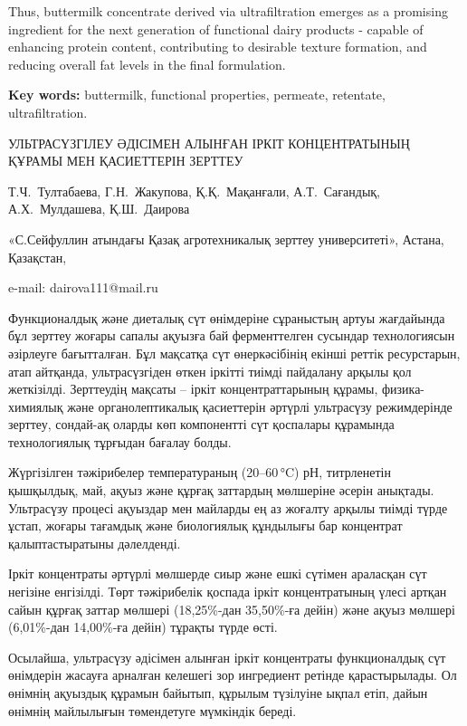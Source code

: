 Thus, buttermilk concentrate derived via ultrafiltration emerges as a
promising ingredient for the next generation of functional dairy
products - capable of enhancing protein content, contributing to
desirable texture formation, and reducing overall fat levels in the
final formulation.

{\bfseries Key words:} buttermilk, functional properties, permeate,
retentate, ultrafiltration.

\begin{header}
УЛЬТРАСҮЗГІЛЕУ ӘДІСІМЕН АЛЫНҒАН ІРКІТ КОНЦЕНТРАТЫНЫҢ ҚҰРАМЫ МЕН ҚАСИЕТТЕРІН ЗЕРТТЕУ

Т.Ч.~Тултабаева,
Г.Н.~Жакупова,
Қ.Қ.~Мақанғали,
А.Т.~Сағандық,
А.Х.~Мулдашева,
Қ.Ш.~Даирова\envelope
\end{header}

\begin{affil}
«С.Сейфуллин атындағы Қазақ агротехникалық зерттеу университеті», Астана, Қазақстан,

e-mail: dairova111@mail.ru
\end{affil}

Функционалдық және диеталық сүт өнімдеріне сұраныстың артуы жағдайында
бұл зерттеу жоғары сапалы ақуызға бай ферменттелген сусындар
технологиясын әзірлеуге бағытталған. Бұл мақсатқа сүт өнеркәсібінің
екінші реттік ресурстарын, атап айтқанда, ультрасүзгіден өткен іркітті
тиімді пайдалану арқылы қол жеткізілді. Зерттеудің мақсаты -- іркіт
концентраттарының құрамы, физика-химиялық және органолептикалық
қасиеттерін әртүрлі ультрасүзу режимдерінде зерттеу, сондай-ақ оларды
көп компонентті сүт қоспалары құрамында технологиялық тұрғыдан бағалау
болды.

Жүргізілген тәжірибелер температураның (20--60\,°C) рН, титрленетін
қышқылдық, май, ақуыз және құрғақ заттардың мөлшеріне әсерін анықтады.
Ультрасүзу процесі ақуыздар мен майларды ең аз жоғалту арқылы тиімді
түрде ұстап, жоғары тағамдық және биологиялық құндылығы бар концентрат
қалыптастыратыны дәлелденді.

Іркіт концентраты әртүрлі мөлшерде сиыр және ешкі сүтімен араласқан сүт
негізіне енгізілді. Төрт тәжірибелік қоспада іркіт концентратының үлесі
артқан сайын құрғақ заттар мөлшері (18,25\%-дан 35,50\%-ға дейін) және
ақуыз мөлшері (6,01\%-дан 14,00\%-ға дейін) тұрақты түрде өсті.

Осылайша, ультрасүзу әдісімен алынған іркіт концентраты функционалдық
сүт өнімдерін жасауға арналған келешегі зор ингредиент ретінде
қарастырылады. Ол өнімнің ақуыздық құрамын байытып, құрылым түзілуіне
ықпал етіп, дайын өнімнің майлылығын төмендетуге мүмкіндік береді.

